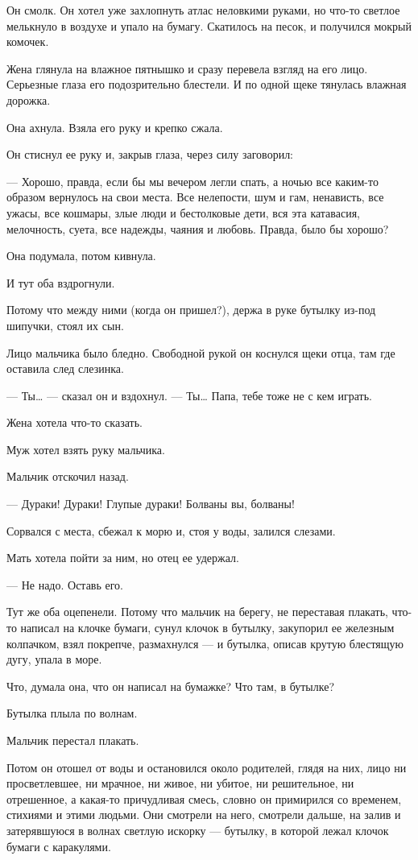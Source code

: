 Он смолк. Он хотел уже захлопнуть атлас неловкими руками, но что-то светлое
мелькнуло в воздухе и упало на бумагу. Скатилось на песок, и получился мокрый
комочек.

Жена глянула на влажное пятнышко и сразу перевела взгляд на его лицо. Серьезные
глаза его подозрительно блестели. И по одной щеке тянулась влажная дорожка.

Она ахнула. Взяла его руку и крепко сжала.

Он стиснул ее руку и, закрыв глаза, через силу заговорил:

— Хорошо, правда, если бы мы вечером легли спать, а ночью все каким-то образом
вернулось на свои места. Все нелепости, шум и гам, ненависть, все ужасы, все
кошмары, злые люди и бестолковые дети, вся эта катавасия, мелочность, суета,
все надежды, чаяния и любовь. Правда, было бы хорошо?

Она подумала, потом кивнула.

И тут оба вздрогнули.

Потому что между ними (когда он пришел?), держа в руке бутылку из-под шипучки,
стоял их сын.

Лицо мальчика было бледно. Свободной рукой он коснулся щеки отца, там где
оставила след слезинка.

— Ты… — сказал он и вздохнул. — Ты… Папа, тебе тоже не с кем играть.

Жена хотела что-то сказать.

Муж хотел взять руку мальчика.

Мальчик отскочил назад.

— Дураки! Дураки! Глупые дураки! Болваны вы, болваны!

Сорвался с места, сбежал к морю и, стоя у воды, залился слезами.

Мать хотела пойти за ним, но отец ее удержал.

— Не надо. Оставь его.

Тут же оба оцепенели. Потому что мальчик на берегу, не переставая плакать, что-
то написал на клочке бумаги, сунул клочок в бутылку, закупорил ее железным
колпачком, взял покрепче, размахнулся — и бутылка, описав крутую блестящую
дугу, упала в море.

Что, думала она, что он написал на бумажке? Что там, в бутылке?

Бутылка плыла по волнам.

Мальчик перестал плакать.

Потом он отошел от воды и остановился около родителей, глядя на них, лицо ни
просветлевшее, ни мрачное, ни живое, ни убитое, ни решительное, ни отрешенное,
а какая-то причудливая смесь, словно он примирился со временем, стихиями и
этими людьми. Они смотрели на него, смотрели дальше, на залив и затерявшуюся в
волнах светлую искорку — бутылку, в которой лежал клочок бумаги с каракулями.

